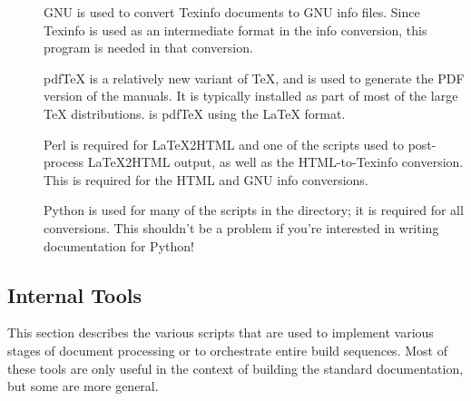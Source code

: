 \documentclass{howto}
\begin{document}
\begin{description}
      \item[]
        GNU  is used to convert Texinfo documents to
        GNU info files.  Since Texinfo is used as an intermediate
        format in the info conversion, this program is needed in that
        conversion.

      \item[]
        pdf\TeX{} is a relatively new variant of \TeX, and is used to
        generate the PDF version of the manuals.  It is typically
        installed as part of most of the large \TeX{} distributions.
         is pdf\TeX{} using the \LaTeX{} format.

      \item[]
        Perl is required for \LaTeX2HTML{} and one of the scripts used
        to post-process \LaTeX2HTML output, as well as the
        HTML-to-Texinfo conversion.  This is required for
        the HTML and GNU info conversions.

      \item[]
        Python is used for many of the scripts in the
         directory; it is required for all
        conversions.  This shouldn't be a problem if you're interested
        in writing documentation for Python!
    \end{description}


  \subsection{Internal Tools \label{tools-internal}}

    This section describes the various scripts that are used to
    implement various stages of document processing or to orchestrate
    entire build sequences.  Most of these tools are only useful
    in the context of building the standard documentation, but some
    are more general.
\end{document}
